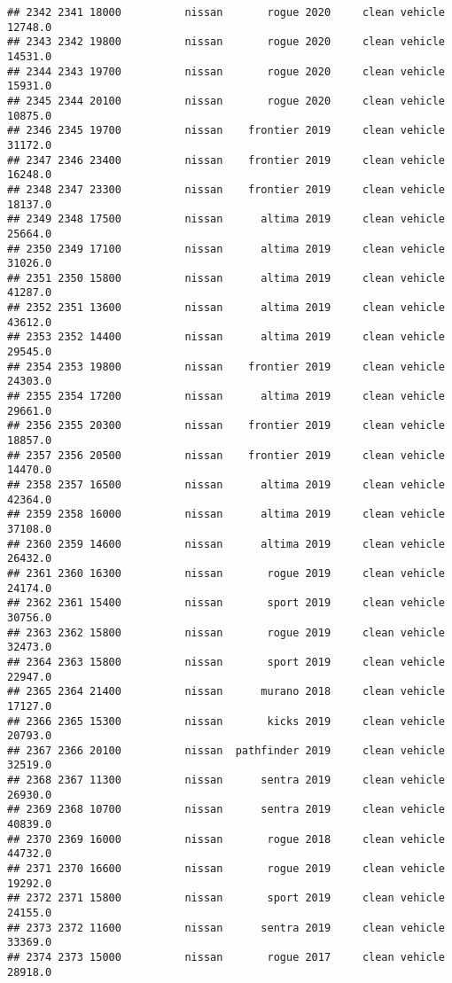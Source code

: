 \documentclass[
]{article}
\begin{document}
\begin{verbatim}
## 2342 2341 18000          nissan       rogue 2020     clean vehicle   12748.0
## 2343 2342 19800          nissan       rogue 2020     clean vehicle   14531.0
## 2344 2343 19700          nissan       rogue 2020     clean vehicle   15931.0
## 2345 2344 20100          nissan       rogue 2020     clean vehicle   10875.0
## 2346 2345 19700          nissan    frontier 2019     clean vehicle   31172.0
## 2347 2346 23400          nissan    frontier 2019     clean vehicle   16248.0
## 2348 2347 23300          nissan    frontier 2019     clean vehicle   18137.0
## 2349 2348 17500          nissan      altima 2019     clean vehicle   25664.0
## 2350 2349 17100          nissan      altima 2019     clean vehicle   31026.0
## 2351 2350 15800          nissan      altima 2019     clean vehicle   41287.0
## 2352 2351 13600          nissan      altima 2019     clean vehicle   43612.0
## 2353 2352 14400          nissan      altima 2019     clean vehicle   29545.0
## 2354 2353 19800          nissan    frontier 2019     clean vehicle   24303.0
## 2355 2354 17200          nissan      altima 2019     clean vehicle   29661.0
## 2356 2355 20300          nissan    frontier 2019     clean vehicle   18857.0
## 2357 2356 20500          nissan    frontier 2019     clean vehicle   14470.0
## 2358 2357 16500          nissan      altima 2019     clean vehicle   42364.0
## 2359 2358 16000          nissan      altima 2019     clean vehicle   37108.0
## 2360 2359 14600          nissan      altima 2019     clean vehicle   26432.0
## 2361 2360 16300          nissan       rogue 2019     clean vehicle   24174.0
## 2362 2361 15400          nissan       sport 2019     clean vehicle   30756.0
## 2363 2362 15800          nissan       rogue 2019     clean vehicle   32473.0
## 2364 2363 15800          nissan       sport 2019     clean vehicle   22947.0
## 2365 2364 21400          nissan      murano 2018     clean vehicle   17127.0
## 2366 2365 15300          nissan       kicks 2019     clean vehicle   20793.0
## 2367 2366 20100          nissan  pathfinder 2019     clean vehicle   32519.0
## 2368 2367 11300          nissan      sentra 2019     clean vehicle   26930.0
## 2369 2368 10700          nissan      sentra 2019     clean vehicle   40839.0
## 2370 2369 16000          nissan       rogue 2018     clean vehicle   44732.0
## 2371 2370 16600          nissan       rogue 2019     clean vehicle   19292.0
## 2372 2371 15800          nissan       sport 2019     clean vehicle   24155.0
## 2373 2372 11600          nissan      sentra 2019     clean vehicle   33369.0
## 2374 2373 15000          nissan       rogue 2017     clean vehicle   28918.0

\end{verbatim}
\end{document}
